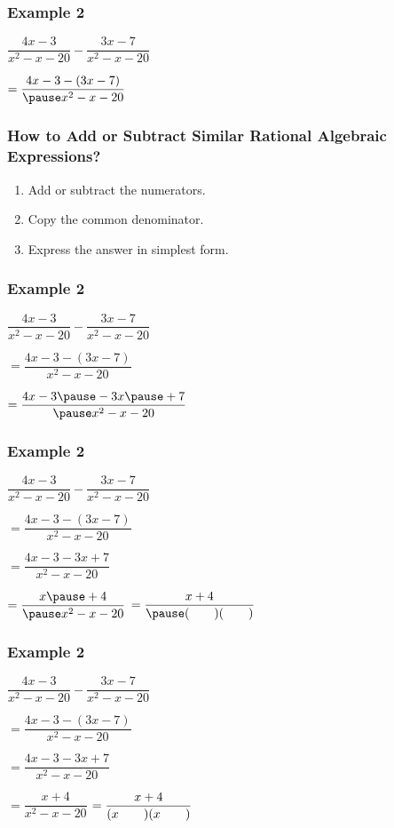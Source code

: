 \documentclass[14pt]{beamer}
\begin{document}
    \begin{frame}
    	\frametitle{Example 2}
    	$ \dfrac{4x - 3}{x^2 -x - 20} - \dfrac{3x - 7}{x^2 -x - 20} $ 
    	
    	\vspace{1em} $ = \dfrac{4x - 3 - (3x - 7)}{\pause x^2 -x - 20} $ 
    \end{frame}

   \begin{frame}
   	\frametitle{How to Add or Subtract Similar Rational Algebraic Expressions?}
   	\begin{enumerate}
   		\item Add or subtract the numerators.
   		\item Copy the common denominator.
   		\item Express the answer in simplest form.
   	\end{enumerate}
   \end{frame}

    \begin{frame}
    	\frametitle{Example 2}
    	$ \dfrac{4x - 3}{x^2 -x - 20} - \dfrac{3x - 7}{x^2 -x - 20} $ 
    	
    	\vspace{1em} $ = \dfrac{4x - 3 - (3x - 7)}{x^2 -x - 20} $ 
    	
    	\pause \vspace{1em} $ = \dfrac{4x - 3 \pause - 3x \pause + 7}{\pause x^2 -x - 20} $ 
    \end{frame}

    \begin{frame}
    	\frametitle{Example 2}
    	$ \dfrac{4x - 3}{x^2 -x - 20} - \dfrac{3x - 7}{x^2 -x - 20} $ 
    	
    	\vspace{1em} $ = \dfrac{4x - 3 - (3x - 7)}{x^2 -x - 20} $ 
    	
    	\vspace{1em} $ = \dfrac{4x - 3- 3x + 7}{x^2 -x - 20} $ 
    	
    	\vspace{1em} $ = \dfrac{x \pause + 4}{\pause x^2 -x - 20} $ 
    	\pause $ = \dfrac{x + 4}{\pause (\void)(\void)} $ 
    \end{frame}

    \begin{frame}
    	\frametitle{Example 2}
    	$ \dfrac{4x - 3}{x^2 -x - 20} - \dfrac{3x - 7}{x^2 -x - 20} $ 
    	
    	\vspace{1em} $ = \dfrac{4x - 3 - (3x - 7)}{x^2 -x - 20} $ 
    	
    	\vspace{1em} $ = \dfrac{4x - 3- 3x + 7}{x^2 -x - 20} $ 
    	
    	\vspace{1em} $ = \dfrac{x + 4}{x^2 -x - 20} $ 
    	$ = \dfrac{x + 4}{ (x\text{\hspace{2em}})(x\text{\hspace{2em}})} $ 
    \end{frame}
\end{document}

